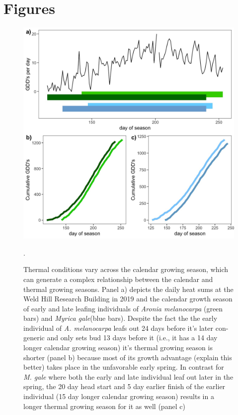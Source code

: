 \documentclass[12 pt]{article}
\begin{document}
\section{Figures} %
\begin{figure}[h!]
    \centering
 \includegraphics[width=.5\textwidth]{..//analyses/figures/aronia_examp.jpeg}
    \caption{Thermal conditions vary across the calendar growing season, which can generate a complex relationship between the calendar and thermal growing seasons. Panel a) depicts the daily heat sums at the Weld Hill Research Building in 2019 and the calendar growth season of early and late leafing individuals of \emph{Aronia melanocarpa} (green bars) and \emph{Myrica gale}(blue bars). Despite the fact the the early individual of \emph{A. melanocarpa} leafs out 24 days before it's later con-generic and only sets bud 13 days before it (i.e., it has a 14 day longer calendar growing season) it's thermal growing season is shorter (panel b) because most of its growth advantage (explain this better) takes place in the unfavorable early spring. In contrast for \emph{M. gale} where both the early and late individual leaf out later in the spring, the 20 day head start and 5 day earlier finish of the earlier individual (15 day longer calendar growing season) results in a longer thermal growing season for it as well (panel c)}.
    \label{fig:concept}
\end{figure}
\end{document}
